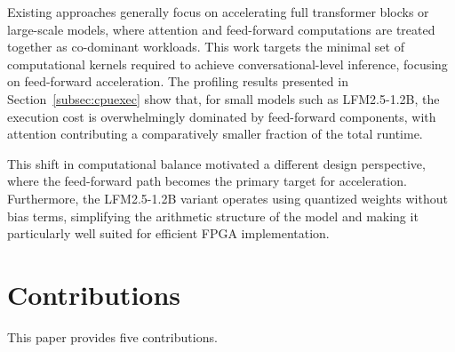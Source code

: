 \documentclass[manuscript,]{acmart} %
\begin{document}
Existing approaches generally focus on accelerating full transformer blocks or large-scale models, where attention and feed-forward computations are treated together as co-dominant workloads. 
This work targets the minimal set of computational kernels required to achieve conversational-level inference, focusing on feed-forward acceleration.
The profiling results presented in Section~\ref{subsec:cpuexec} show that, for small models such as LFM2.5-1.2B, the execution cost is overwhelmingly dominated by feed-forward components, with attention contributing a comparatively smaller fraction of the total runtime. 

This shift in computational balance motivated a different design perspective, where the feed-forward path becomes the primary target for acceleration.
Furthermore, the LFM2.5-1.2B variant operates using quantized weights without bias terms, simplifying the arithmetic structure of the model and making it particularly well suited for efficient FPGA implementation.

\section{Contributions}\label{sec:contribution}
This paper provides five contributions.
\end{document}
